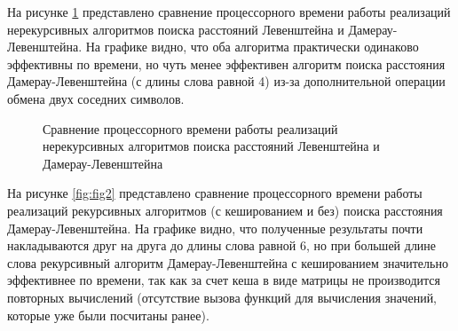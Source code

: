 На рисунке \ref{fig:fig1} представлено сравнение процессорного времени работы реализаций нерекурсивных алгоритмов поиска расстояний Левенштейна и Дамерау-Левенштейна. На графике видно, что оба алгоритма практически одинаково эффективны по времени, но чуть менее эффективен алгоритм поиска расстояния Дамерау-Левенштейна (с длины слова равной 4) из-за дополнительной операции обмена двух соседних символов.

\begin{figure}[h!]
	
	
	\caption{Сравнение процессорного времени работы реализаций нерекурсивных алгоритмов поиска расстояний Левенштейна и Дамерау-Левенштейна}
	
	\label{fig:fig1}
	
\end{figure}

\FloatBarrier
На рисунке \ref{fig:fig2} представлено сравнение процессорного времени работы реализаций рекурсивных алгоритмов (с кешированием и без) поиска расстояния Дамерау-Левенштейна. На графике видно, что полученные результаты почти накладываются друг на друга до длины слова равной 6, но при большей длине слова рекурсивный алгоритм Дамерау-Левенштейна с кешированием значительно эффективнее по времени, так как за счет кеша в виде матрицы не производится повторных вычислений (отсутствие вызова функций для вычисления значений, которые уже были посчитаны ранее).

